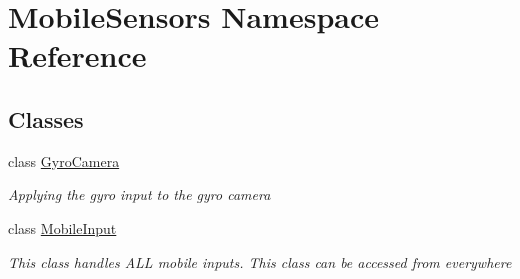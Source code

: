 \hypertarget{namespace_mobile_sensors}{}\section{Mobile\+Sensors Namespace Reference}
\label{namespace_mobile_sensors}
\subsection*{Classes}
\begin{DoxyCompactItemize}
\item 
class \mbox{\hyperlink{class_mobile_sensors_1_1_gyro_camera}{Gyro\+Camera}}
\begin{DoxyCompactList}\small\item\em Applying the gyro input to the gyro camera \end{DoxyCompactList}\item 
class \mbox{\hyperlink{class_mobile_sensors_1_1_mobile_input}{Mobile\+Input}}
\begin{DoxyCompactList}\small\item\em This class handles A\+LL mobile inputs. This class can be accessed from everywhere \end{DoxyCompactList}\end{DoxyCompactItemize}
